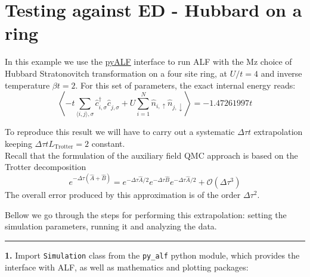     
    

    
    \hypertarget{testing-against-ed---hubbard-on-a-ring}{%
\section{Testing against ED - Hubbard on a
ring}\label{testing-against-ed---hubbard-on-a-ring}}

    In this example we use the
\href{https://git.physik.uni-wuerzburg.de/ALF/pyALF/-/tree/ALF-2.4/}{pyALF}
interface to run ALF with the Mz choice of Hubbard Stratonovitch
transformation on a four site ring, at \(U/t=4\) and inverse temperature
\(\beta t = 2\). For this set of parameters, the exact internal energy
reads:\\
\[
 \left\langle -t \sum_{\langle i,j\rangle, \sigma} \hat{c}_{i,\sigma}^{\dagger} \hat{c}_{j,\sigma}^{\phantom\dagger}   +  U  \sum_{i=1}^{N} \hat{n}_{i,\uparrow}\hat{n}_{j,\downarrow}  \right\rangle  =   -1.47261997 t 
\]

To reproduce this result we will have to carry out a systematic
\(\Delta \tau t\) extrapolation keeping
\(\Delta \tau t L_\text{Trotter} = 2\) constant.\\
Recall that the formulation of the auxiliary field QMC approach is based
on the Trotter decomposition \[
e^{ -\Delta \tau \left( \hat{A} + \hat{B} \right) }  =  e^{ -\Delta \tau \hat{A}/2}  e^{ -\Delta \tau  \hat{B}  }   e^{ -\Delta \tau \hat{A}/2}  +  \mathcal{O} \left (\Delta  \tau^3\right)
\] The overall error produced by this approximation is of the order
\(\Delta \tau^2\).

Bellow we go through the steps for performing this extrapolation:
setting the simulation parameters, running it and analyzing the data.

\begin{center}\rule{0.5\linewidth}{0.5pt}\end{center}

\textbf{1.} Import \texttt{Simulation} class from the \texttt{py\_alf}
python module, which provides the interface with ALF, as well as
mathematics and plotting packages:

